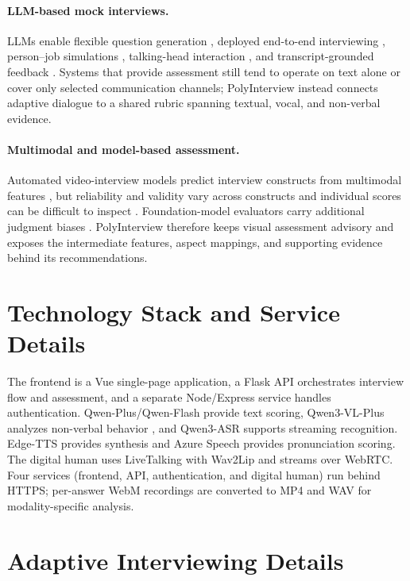 \documentclass[11pt]{article}
\begin{document}
\paragraph{LLM-based mock interviews.} LLMs enable flexible question generation \citep{li2023ezinterviewer}, deployed end-to-end interviewing \citep{wang2023interviewbot}, person--job simulations \citep{sun2025mockllm}, talking-head interaction \citep{nguyen2025siminterview}, and transcript-grounded feedback \citep{daryanto2025conversate}. Systems that provide assessment still tend to operate on text alone or cover only selected communication channels; PolyInterview instead connects adaptive dialogue to a shared rubric spanning textual, vocal, and non-verbal evidence.

\paragraph{Multimodal and model-based assessment.} Automated video-interview models predict interview constructs from multimodal features \citep{naim2018automated,hemamou2019hirenet}, but reliability and validity vary across constructs and individual scores can be difficult to inspect \citep{hickman2022automated}. Foundation-model evaluators carry additional judgment biases \citep{zheng2023judging}. PolyInterview therefore keeps visual assessment advisory and exposes the intermediate features, aspect mappings, and supporting evidence behind its recommendations.

\section{Technology Stack and Service Details}
\label{app:stack}
The frontend is a Vue single-page application, a Flask API orchestrates interview flow and assessment, and a separate Node/Express service handles authentication. Qwen-Plus/Qwen-Flash provide text scoring, Qwen3-VL-Plus analyzes non-verbal behavior \citep{bai2023qwenvl}, and Qwen3-ASR supports streaming recognition. Edge-TTS provides synthesis and Azure Speech provides pronunciation scoring. The digital human uses LiveTalking with Wav2Lip \citep{prajwal2020wav2lip} and streams over WebRTC. Four services (frontend, API, authentication, and digital human) run behind HTTPS; per-answer WebM recordings are converted to MP4 and WAV for modality-specific analysis.

\section{Adaptive Interviewing Details}
\label{app:adaptive}
\end{document}
